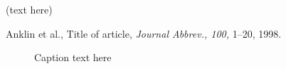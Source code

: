 \documentclass[draft,agums]{aguplus}
\begin{document}
\begin{article}

%
%

\begin{acknowledgments}
(text here)
\end{acknowledgments}

%
%

\begin{thebibliography}{}

\bibitem{}
Anklin et al., Title of article, {\it Journal Abbrev., 100,}
1--20, 1998.
%
%
%
%
%
%


\end{thebibliography}

%
%
\end{article}
\newpage



%
%
%

\begin{figure}
 \caption{Caption text here}
\end{figure}
\end{document}
